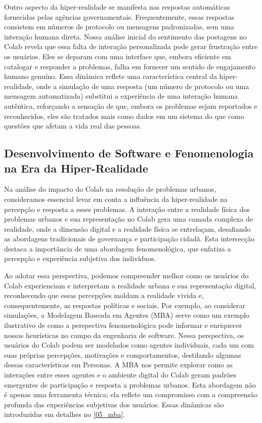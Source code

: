 Outro aspecto da hiper-realidade se manifesta nas respostas automáticas fornecidas pelas agências governamentais. Frequentemente, essas respostas consistem em números de protocolo ou mensagens padronizadas, sem uma interação humana direta. Nossa análise inicial do sentimento das postagens no Colab revela que essa falta de interação personalizada pode gerar frustração entre os usuários. Eles se deparam com uma interface que, embora eficiente em catalogar e responder a problemas, falha em fornecer um sentido de engajamento humano genuíno. Essa dinâmica reflete uma característica central da hiper-realidade, onde a simulação de uma resposta (um número de protocolo ou uma mensagem automatizada) substitui a experiência de uma interação humana autêntica, reforçando a sensação de que, embora os problemas sejam reportados e reconhecidos, eles são tratados mais como dados em um sistema do que como questões que afetam a vida real das pessoas.

\subsection*{Desenvolvimento de Software e Fenomenologia na Era da Hiper-Realidade}

Na análise do impacto do Colab na resolução de problemas urbanos, consideramos essencial levar em conta a influência da hiper-realidade na percepção e resposta a esses problemas. A interação entre a realidade física dos problemas urbanos e sua representação no Colab gera uma camada complexa de realidade, onde a dimensão digital e a realidade física se entrelaçam, desafiando as abordagens tradicionais de governança e participação cidadã. Esta intersecção destaca a importância de uma abordagem fenomenológica, que enfatiza a percepção e experiência subjetiva dos indivíduos.

Ao adotar essa perspectiva, podemos compreender melhor como os usuários do Colab experienciam e interpretam a realidade urbana e sua representação digital, reconhecendo que essas percepções moldam a realidade vivida e, consequentemente, as respostas políticas e sociais. Por exemplo, ao considerar simulações, a Modelagem Baseada em Agentes (MBA) serve como um exemplo ilustrativo de como a perspectiva fenomenológica pode informar e enriquecer nossas heurísticas no campo da engenharia de software. Nessa perspectiva, os usuários do Colab podem ser modelados como agentes individuais, cada um com suas próprias percepções, motivações e comportamentos, destilando algumas dessas características em Personas. A MBA nos permite explorar como as interações entre esses agentes e o ambiente digital do Colab geram padrões emergentes de participação e resposta a problemas urbanos. Esta abordagem não é apenas uma ferramenta técnica; ela reflete um compromisso com a compreensão profunda das experiências subjetivas dos usuários. Essas dinâmicas são introduzidas em detalhes no \autoref{05_mba}.

